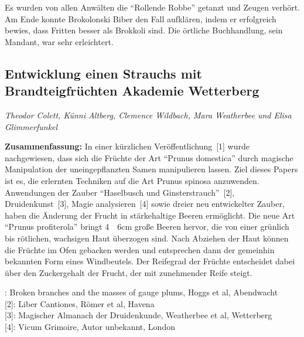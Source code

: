 \documentclass[final]{multiversum}
\begin{document}
Es wurden von allen Anwälten die \enquote{Rollende Robbe} getanzt und Zeugen
verhört.  Am Ende konnte Brokolonski Biber den Fall aufklären, indem er
erfolgreich bewies, dass Fritten besser als Brokkoli sind.  Die örtliche
Buchhandlung, sein Mandant, war sehr erleichtert.

\subsection{Entwicklung einen Strauchs mit
Brandteigfrüchten \textemdash{} Akademie Wetterberg}
\emph{Theodor Colett, Künni Altberg, Clemence Wildbach,
Mara Weatherbee und Elisa Glimmerfunkel}

\textbf{Zusammenfassung:} In einer kürzlichen Veröffentlichung~[1] wurde
nachgewiesen, dass sich die Früchte der Art \enquote{Prunus domestica} durch
magische Manipulation der uneingepflanzten Samen manipulieren lassen.  Ziel
dieses Papers ist es, die erlernten Techniken auf die Art Prunus spinosa
anzuwenden.  Anwendungen der Zauber \enquote{Haselbusch und Ginsterstrauch}~[2],
Druidenkunst~[3], Magie analysieren~[4] sowie dreier neu entwickelter Zauber,
haben die Änderung der Frucht in stärkehaltige Beeren ermöglicht.  Die neue Art
\enquote{Prunus profiterola} bringt 4~\textendash~6cm große Beeren hervor, die
von einer grünlich bis rötlichen, wachsigen Haut überzogen sind.  Nach Abziehen
der Haut können die Früchte im Ofen gebacken werden und entsprechen dann der
gemeinhin bekannten Form eines Windbeutels.  Der Reifegrad der Früchte
entscheidet dabei über den Zuckergehalt der Frucht, der mit zunehmender Reife
steigt. 


\noindent[1]: Broken branches and the masses of gauge plums,
Hoggs et al, Abendwacht\\{}
[2]: Liber Cantiones, Römer et al, Havena\\{}
[3]: Magischer Almanach der Druidenkunde, Weatherbee et al, Wetterberg\\{}
[4]: Vicum Grimoire, Autor unbekannt, London

\end{document}
